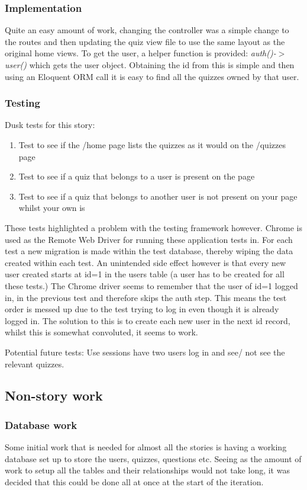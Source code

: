\subsubsection{Implementation}
Quite an easy amount of work, changing the controller was a simple change to the routes and then updating the quiz view file to use the same layout as the original home views. To get the user, a helper function is provided: \textit{auth()-$>$user()} which gets the user object. Obtaining the id from this is simple and then using an Eloquent ORM call it is easy to find all the quizzes owned by that user.
\subsubsection{Testing}
Dusk tests for this story:
\begin{enumerate}
	\item Test to see if the /home page lists the quizzes as it would on the /quizzes page
	\item Test to see if a quiz that belongs to a user is present on the page
	\item Test to see if a quiz that belongs to another user is not present on your page whilst your own is
\end{enumerate}
These tests highlighted a problem with the testing framework however. Chrome is used as the Remote Web Driver for running these application tests in. For each test a new migration is made within the test database, thereby wiping the data created within each test. An unintended side effect however is that every new user created starts at id=1 in the users table (a user has to be created for all these tests.) The Chrome driver seems to remember that the user of id=1 logged in, in the previous test and therefore skips the auth step. This means the test order is messed up due to the test trying to log in even though it is already logged in. The solution to this is to create each new user in the next id record, whilst this is somewhat convoluted, it seems to work.

Potential future tests: Use sessions have two users log in and see/ not see the relevant quizzes.
\newpage

\subsection{Non-story work}
\subsubsection{Database work}
Some initial work that is needed for almost all the stories is having a working database set up to store the users, quizzes, questions etc. Seeing as the amount of work to setup all the tables and their relationships would not take long, it was decided that this could be done all at once at the start of the iteration.

